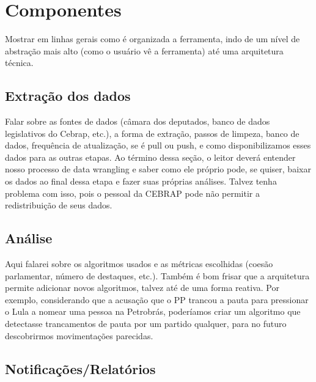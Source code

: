 \section{Componentes}

Mostrar em linhas gerais como é organizada a ferramenta, indo de um nível de abstração mais alto (como o usuário vê a ferramenta) até uma arquitetura técnica.




\subsection{Extração dos dados}

Falar sobre as fontes de dados (câmara dos deputados, banco de dados legislativos do Cebrap, etc.), a forma de extração, passos de limpeza, banco de dados, frequência de atualização, se é pull ou push, e como disponibilizamos esses dados para as outras etapas. Ao término dessa seção, o leitor deverá entender nosso processo de data wrangling e saber como ele próprio pode, se quiser, baixar os dados ao final dessa etapa e fazer suas próprias análises. Talvez tenha problema com isso, pois o pessoal da CEBRAP pode não permitir a redistribuição de seus dados.



\subsection{Análise}

Aqui falarei sobre os algoritmos usados e as métricas escolhidas (coesão parlamentar, número de destaques, etc.). Também é bom frisar que a arquitetura permite adicionar novos algoritmos, talvez até de uma forma reativa. Por exemplo, considerando que a acusação que o PP trancou a pauta para pressionar o Lula a nomear uma pessoa na Petrobrás, poderíamos criar um algoritmo que detectasse trancamentos de pauta por um partido qualquer, para no futuro descobrirmos movimentações parecidas.

\subsection{Notificações/Relatórios}

